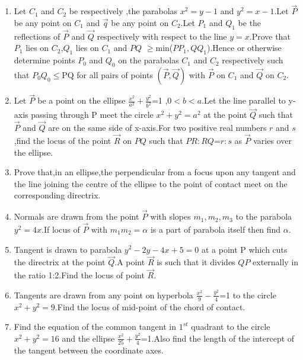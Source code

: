 \documentclass[journal]{IEEEtran}
\numberwithin{equation}{enumi}
\numberwithin{figure}{enumi}
\begin{document}
\begin{enumerate}
\hfill{}
\item Let $C_1$ and $C_2$ be respectively ,the parabolas $x^2=y-1$ and $y^2=x-1$.Let $\Vec{P}$ be any point on $C_1$ and $\vec{q}$ be any point on $C_2$.Let $P_1$ and $Q_1$ be the reflections of $\Vec{P}$ and $\Vec{Q}$ respectively with respect to the line $y=x$.Prove that $P_1$ lies on $C_2$,$Q_1$ lies on $C_1$ and $PQ$ $\geq$min({$PP_1,QQ_1$}).Hence or otherwise determine points $P_0$ and $Q_0$ on the parabolas $C_1$ and $C_2$ respectively such that $P_0Q_0$$\leq$PQ for all pairs of points $(\Vec{P},\Vec{Q})$ with $\vec{P}$ on $C_1$ and $\vec{Q}$ on $C_2$.
\hfill{}
\item Let $\Vec{P}$ be a point on the ellipse $\frac{x^2}{a^2}+\frac{y^2}{b^2}$=1 ,$0<b<a$.Let the line parallel to y-axis passing through P meet the circle $x^2+y^2=a^2$ at the point $\Vec{Q}$ such that $\Vec{P}$ and $\Vec{Q}$ are on the same side of x-axis.For two positive real numbers $r$ and $s$,find the locus of the point $\Vec{R}$ on $PQ$ such that $PR:RQ$=$r:s$ as $\Vec{P}$ varies over the ellipse.
\hfill{}
\item Prove that,in an ellipse,the perpendicular from a focus upon any tangent and the line joining the centre of the ellipse to the point of contact meet on the  corresponding directrix.
\\\hfill{}
\item Normals are drawn from the point $\Vec{P}$ with slopes $m_1,m_2,m_3$ to the parabola $y^2=4x$.If locus of $\Vec{P}$ with $m_1m_2=\alpha$ is a part of parabola itself then find $\alpha$.
\hfill{}  
\item Tangent is drawn to parabola $y^2-2y-4x+5=0$ at a point P which cuts the directrix at the point $\Vec{Q}$.A point $\Vec{R}$ is such that it divides $QP$ externally in the ratio 1:2.Find the locus of point $\Vec{R}$.
\hfill{}
\item Tangents are drawn from any point on hyperbola $\frac{x^2}{9}-\frac{y^2}{4}$=1 to the circle $x^2+y^2=9$.Find the locus of mid-point of the chord of contact.
 \hfill{}
\item Find the equation of the common tangent in $1^{st}$ quadrant to the circle $x^2+y^2=16$ and the ellipse $\frac{x^2}{25}+\frac{y^2}{4}$=1.Also find the length of the intercept of the tangent between the coordinate axes.
\hfill{}
\end{enumerate}
\end{document}
